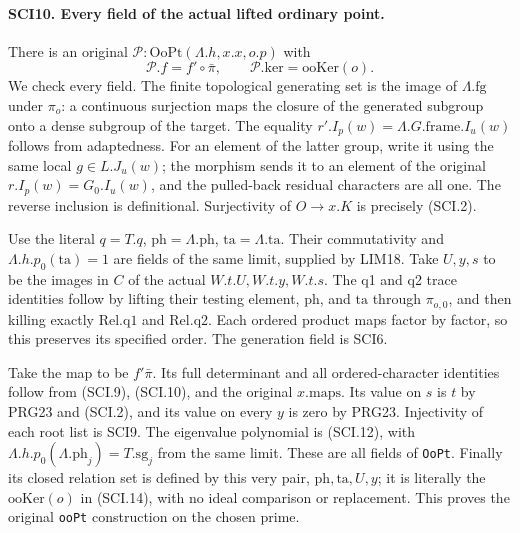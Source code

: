 \paragraph{SCI10. Every field of the actual lifted ordinary point.}
\label{claim:SCI10}
There is an original \(\mathcal P:\mathrm{OoPt}(\Lambda.h,x.x,o.p)\)
with
\[
 \mathcal P.f=f'\circ\bar\pi,\qquad
 \mathcal P.\mathrm{ker}=\mathrm{ooKer}(o).                \tag{SCI.14}
\]
We check every field. The finite topological generating set is
the image of \(\Lambda.\mathrm{fg}\) under \(\pi_o\): a
continuous surjection maps the closure of the generated subgroup
onto a dense subgroup of the target. The equality
\(r'.I_p(w)=\Lambda.G.\mathrm{frame}.I_u(w)\) follows from
adaptedness. For an element of the latter group, write it using
the same local \(g\in L.J_u(w)\); the morphism sends it to
an element of the original \(r.I_p(w)=G_0.I_u(w)\), and the
pulled-back residual characters are all one. The reverse
inclusion is definitional. Surjectivity of \(O\to x.K\)
is precisely (SCI.2).

Use the literal \(q=T.q\), \(\mathrm{ph}=\Lambda.\mathrm{ph}\),
\(\mathrm{ta}=\Lambda.\mathrm{ta}\). Their commutativity
and \(\Lambda.h.p_0(\mathrm{ta})=1\) are fields of the same
limit, supplied by LIM18. Take \(U,y,s\) to be the images
in \(C\) of the actual \(W.t.U,W.t.y,W.t.s\).
The q1 and q2 trace identities follow by lifting their testing
element, \(\mathrm{ph}\), and \(\mathrm{ta}\) through
\(\pi_{o,0}\), and then killing exactly \(\mathrm{Rel.q1}\)
and \(\mathrm{Rel.q2}\). Each ordered product maps factor by
factor, so this preserves its specified order. The generation
field is SCI6.

Take the map to be \(f'\bar\pi\). Its full determinant and
all ordered-character identities follow from (SCI.9), (SCI.10),
and the original \(x.\mathrm{maps}\). Its value on \(s\)
is \(t\) by PRG23 and (SCI.2), and its value on every \(y\)
is zero by PRG23. Injectivity of each root list is SCI9.
The eigenvalue polynomial is (SCI.12), with
\(\Lambda.h.p_0(\Lambda.\mathrm{ph}_j)=T.\mathrm{sg}_j\)
from the same limit. These are all fields of \texttt{OoPt}.
Finally its closed relation set is defined by this very pair,
\(\mathrm{ph},\mathrm{ta},U,y\); it is literally the
\(\mathrm{ooKer}(o)\) in (SCI.14), with no ideal comparison
or replacement. This proves the original \texttt{ooPt}
construction on the chosen prime.

